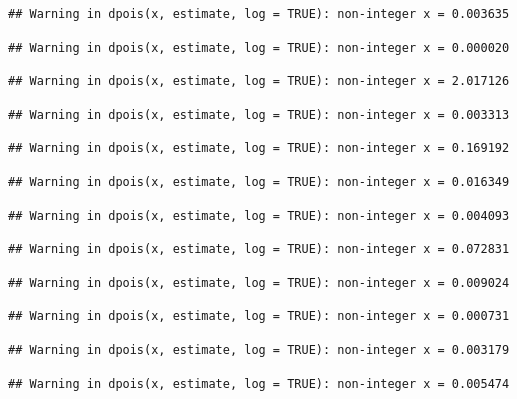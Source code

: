 \documentclass[]{article}
\begin{document}
\begin{verbatim}
## Warning in dpois(x, estimate, log = TRUE): non-integer x = 0.003635
\end{verbatim}

\begin{verbatim}
## Warning in dpois(x, estimate, log = TRUE): non-integer x = 0.000020
\end{verbatim}

\begin{verbatim}
## Warning in dpois(x, estimate, log = TRUE): non-integer x = 2.017126
\end{verbatim}

\begin{verbatim}
## Warning in dpois(x, estimate, log = TRUE): non-integer x = 0.003313
\end{verbatim}

\begin{verbatim}
## Warning in dpois(x, estimate, log = TRUE): non-integer x = 0.169192
\end{verbatim}

\begin{verbatim}
## Warning in dpois(x, estimate, log = TRUE): non-integer x = 0.016349
\end{verbatim}

\begin{verbatim}
## Warning in dpois(x, estimate, log = TRUE): non-integer x = 0.004093
\end{verbatim}

\begin{verbatim}
## Warning in dpois(x, estimate, log = TRUE): non-integer x = 0.072831
\end{verbatim}

\begin{verbatim}
## Warning in dpois(x, estimate, log = TRUE): non-integer x = 0.009024
\end{verbatim}

\begin{verbatim}
## Warning in dpois(x, estimate, log = TRUE): non-integer x = 0.000731
\end{verbatim}

\begin{verbatim}
## Warning in dpois(x, estimate, log = TRUE): non-integer x = 0.003179
\end{verbatim}

\begin{verbatim}
## Warning in dpois(x, estimate, log = TRUE): non-integer x = 0.005474
\end{verbatim}
\end{document}
